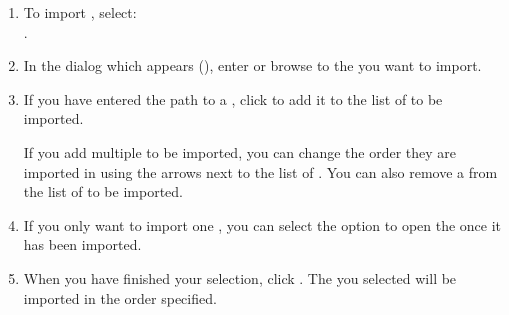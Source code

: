 

\begin{enumerate} 
\item To import \gdprojects{},  select:\\
 . 
\item In the dialog which appears (), enter or browse to the \gdprojects{} you want to import. 

\item If you have entered the path to a \gdproject{}, click  to add it to the list of \gdprojects{} to be imported. 


If you add multiple \gdprojects{} to be imported, you can change the order they are imported in using the arrows next to the list of \gdprojects{}. You can also remove a \gdproject{} from the list of \gdprojects{} to be imported. 

\item If you only want to import one \gdproject{}, you can select the option to open the \gdproject{} once it has been imported. 

\item When you have finished your selection, click . The \gdprojects{} you selected will be imported in the order specified. 
\end{enumerate}

